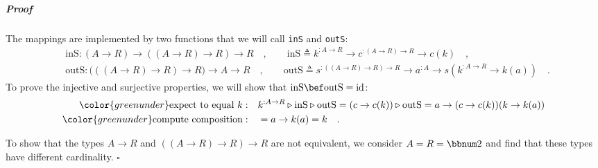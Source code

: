 \subparagraph{Proof}

The mappings are implemented by two functions that we will call \lstinline!inS!
and \lstinline!outS!:
\begin{align*}
 & \text{inS}:(A\rightarrow R)\rightarrow((A\rightarrow R)\rightarrow R)\rightarrow R\quad,\quad\quad\text{inS}\triangleq k^{:A\rightarrow R}\rightarrow c^{:(A\rightarrow R)\rightarrow R}\rightarrow c(k)\quad,\\
 & \text{outS}:\big(((A\rightarrow R)\rightarrow R)\rightarrow R\big)\rightarrow A\rightarrow R\quad,\quad\quad\text{outS}\triangleq s^{:((A\rightarrow R)\rightarrow R)\rightarrow R}\rightarrow a^{:A}\rightarrow s(k^{:A\rightarrow R}\rightarrow k(a))\quad.
\end{align*}
To prove the injective and surjective properties, we will show that
$\text{inS}\bef\text{outS}=\text{id}$:
\begin{align*}
{\color{greenunder}\text{expect to equal }k:}\quad & k^{:A\rightarrow R}\triangleright\text{inS}\triangleright\text{outS}=(c\rightarrow c(k))\triangleright\text{outS}=a\rightarrow(c\rightarrow c(k))(k\rightarrow k(a))\\
{\color{greenunder}\text{compute composition}:}\quad & =a\rightarrow k(a)=k\quad.
\end{align*}

To show that the types $A\rightarrow R$ and $((A\rightarrow R)\rightarrow R)\rightarrow R$
are not equivalent, we consider $A=R=\bbnum 2$ and find that these
types have different cardinality. $\square$

